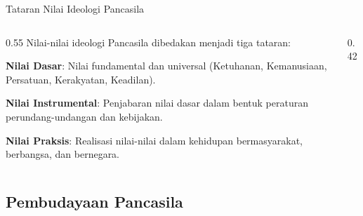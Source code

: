 \documentclass[11pt, aspectratio=169]{beamer}
\begin{document}
\begin{frame}{Tataran Nilai Ideologi Pancasila}
    \begin{columns}[c] 
        \begin{column}{0.55\textwidth}
            \small
            Nilai-nilai ideologi Pancasila dibedakan menjadi tiga tataran:

            \vspace{3mm}
            \textbf{\color{primary}Nilai Dasar}: Nilai fundamental dan universal (Ketuhanan, Kemanusiaan, Persatuan, Kerakyatan, Keadilan).
            
            \vspace{2mm}
            \textbf{\color{accentB}Nilai Instrumental}: Penjabaran nilai dasar dalam bentuk peraturan perundang-undangan dan kebijakan.
            
            \vspace{2mm}
            \textbf{\color{accentA}Nilai Praksis}: Realisasi nilai-nilai dalam kehidupan bermasyarakat, berbangsa, dan bernegara.
        \end{column}
        \begin{column}{0.42\textwidth}
            \centering
        \end{column}
    \end{columns}
\end{frame}

\subsection{Pembudayaan Pancasila}
\end{document}
